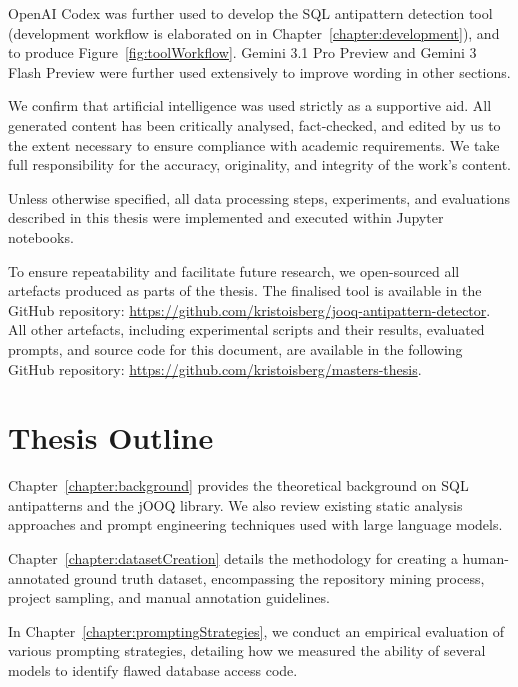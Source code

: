 OpenAI Codex was further used to develop the SQL antipattern detection tool (development workflow is elaborated on in Chapter~\ref{chapter:development}), and to produce Figure~\ref{fig:toolWorkflow}. Gemini 3.1 Pro Preview and Gemini 3 Flash Preview  were further used extensively to improve wording in other sections.

We confirm that artificial intelligence was used strictly as a supportive aid. All generated content has been critically analysed, fact-checked, and edited by us to the extent necessary to ensure compliance with academic requirements. We take full responsibility for the accuracy, originality, and integrity of the work’s content.

Unless otherwise specified, all data processing steps, experiments, and evaluations described in this thesis were implemented and executed within Jupyter  notebooks.

To ensure repeatability and facilitate future research, we open-sourced all artefacts produced as parts of the thesis. The finalised tool is available in the GitHub repository: \href{https://github.com/kristoisberg/jooq-antipattern-detector}{https://github.com/kristoisberg/jooq-antipattern-detector}. All other artefacts, including experimental scripts and their results, evaluated prompts, and source code for this document, are available in the following GitHub repository: \href{https://github.com/kristoisberg/masters-thesis}{https://github.com/kristoisberg/masters-thesis}.

\section{Thesis Outline}\label{sec:outline}

Chapter~\ref{chapter:background} provides the theoretical background on SQL antipatterns and the jOOQ library. We also review existing static analysis approaches and prompt engineering techniques used with large language models.

Chapter~\ref{chapter:datasetCreation} details the methodology for creating a human-annotated ground truth dataset, encompassing the repository mining process, project sampling, and manual annotation guidelines. 

In Chapter~\ref{chapter:promptingStrategies}, we conduct an empirical evaluation of various prompting strategies, detailing how we measured the ability of several models to identify flawed database access code. 

